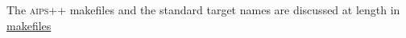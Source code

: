The \textsc{aips++} makefiles and the standard target names are discussed at
length in \hyperref{makefiles}{makefiles (see AIPS++ System Manual, Section }{ for more details)}{makefiles}































